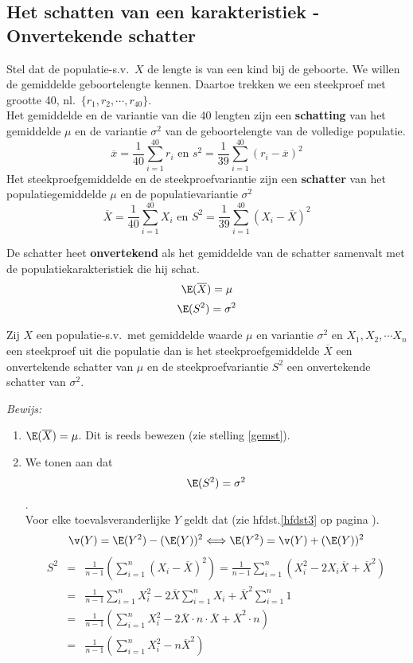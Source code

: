 {\subsection{Het schatten van een karakteristiek - Onvertekende schatter}

Stel dat  de populatie-s.v.\ $X$  de lengte is van een kind bij de geboorte. We willen de gemiddelde geboortelengte kennen. Daartoe trekken we een steekproef met grootte 40, nl.\ $\{r_1,r_2,\cdots ,r_{40}\}$. \\
Het gemiddelde en de variantie van die 40 lengten zijn een \textbf{schatting} van het  gemiddelde $\mu$  en de variantie $\sigma^2$ van de geboortelengte van de volledige populatie.
$$\overline{x}=\frac{1}{40}\sum_{i=1}^{40}r_i\mbox{ en }
s^2=\frac{1}{39}\sum_{i=1}^{40}(r_i-\overline{x})^2$$ Het steekproefgemiddelde en de steekproefvariantie zijn een \textbf{schatter} van het populatiegemiddelde $\mu$ en de populatievariantie $\sigma^2$ $$\overline{X}=\frac{1}{40}\sum_{i=1}^{40}X_i\mbox{ en } S^2=\frac{1}{39}\sum_{i=1}^{40}(X_i-\overline{X})^2$$

De schatter heet \textbf{onvertekend} als het gemiddelde van de schatter samenvalt met de populatiekarakteristiek die hij schat.
$$\E(\overline{X})=\mu$$
$$\E(S^2)=\sigma^2$$
\begin{stel}\label{schat}
Zij $X$ een populatie-s.v.\ met gemiddelde waarde $\mu$ en variantie $\sigma^2$ en $X_1, X_2, \cdots X_n$  een steekproef uit die populatie dan is het steekproefgemiddelde $\overline{X}$ een onvertekende schatter van $\mu$ en de steekproefvariantie $S^2$ een onvertekende schatter van $\sigma^2$.
\end{stel}
{\em Bewijs:}  
\begin{enumerate}
\item $\E(\overline{X})=\mu$. Dit is reeds bewezen (zie stelling \ref{gemst}).
\item We tonen aan dat $$\E(S^2)=\sigma^2$$.\\
Voor elke toevalsveranderlijke $Y$ geldt dat (zie hfdst.\ref{hfdst3} op pagina \pageref{ongekend}).
$$\v(Y)=\E(Y^2)-(\E(Y))^2\Longleftrightarrow \E(Y^2)=\v(Y)+(\E(Y))^2$$
\begin{eqnarray*}
S^2 & =& \frac{1}{n-1}\left( \sum_{i=1}^n(X_i-\overline{X})^2\right)=\frac{1}{n-1}\sum_{i=1}^n(X_i^2-2X_i\overline{X}+\overline{X}^2)\\
&=&\frac{1}{n-1}\sum_{i=1}^nX_i^2-2\overline{X}\sum_{i=1}^nX_i+\overline{X}^2\sum_{i=1}^n1\\
&= &\frac{1}{n-1}\left(\sum_{i=1}^nX_i^2-2\overline{X}\cdot n\cdot\overline{X}+\overline{X}^2\cdot n\right)\\
&=&\frac{1}{n-1}\left( \sum_{i=1}^nX_i^2-n\overline{X}^2\right)
\end{eqnarray*}


\end{enumerate}}
